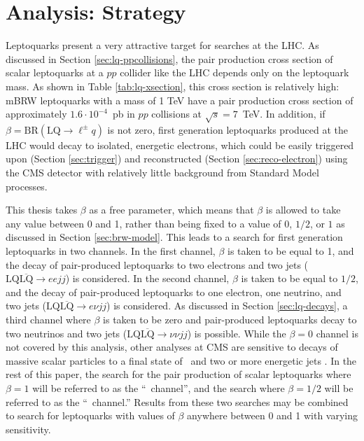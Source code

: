 \chapter{Analysis: Strategy}
\label{ch:analysis-strategy}

Leptoquarks present a very attractive target for searches at the LHC. 
As discussed in Section \ref{sec:lq-ppcollisions}, 
the pair production cross section of scalar leptoquarks at a $pp$ 
collider like the LHC depends only on the leptoquark mass.
As shown in Table \ref{tab:lq-xsection}, this 
cross section is relatively high: mBRW leptoquarks with a mass of 1 TeV 
have a pair production cross section of approximately 
$1.6 \cdot 10^{-4}$~pb in $pp$ collisions at $\sqrt{s} = 7$~TeV.
In addition, if $\beta = \text{BR}(\text{LQ}\rightarrow\ell^{\pm}q)$
is not zero, first generation leptoquarks produced at the LHC would decay to
isolated, energetic electrons, which could be easily triggered upon 
(Section \ref{sec:trigger}) and reconstructed (Section \ref{sec:reco-electron}) using the CMS detector 
with relatively little background from Standard Model processes.

This thesis takes $\beta$ as a free parameter, which means that $\beta$ is allowed
to take any value between 0 and 1, rather than being fixed to a value of $0$,
$1/2$, or $1$ as discussed in Section \ref{sec:brw-model}.
This leads to a search for first generation leptoquarks in two channels.
In the first channel, $\beta$ is taken to be equal to 1, and 
the decay of pair-produced leptoquarks to two electrons and two jets
($\text{LQ}\overline{\text{LQ}}\rightarrow eejj$) is considered.
In the second channel, $\beta$ is taken to be equal to $1/2$, and 
the decay of pair-produced leptoquarks to one electron, one neutrino, and two jets 
($\text{LQ}\overline{\text{LQ}}\rightarrow e\nu jj$) is considered.
As discussed in Section \ref{sec:lq-decays}, a third channel 
where $\beta$ is taken to be zero and pair-produced leptoquarks decay to two 
neutrinos and two jets 
($\text{LQ}\overline{\text{LQ}}\rightarrow \nu\nu jj$) is possible.  
While the $\beta = 0$ channel is not 
covered by this analysis, other analyses at CMS are sensitive to decays 
of massive scalar particles to a final state of \met~and two or more energetic jets \cite{RA1susy-2011}.
In the rest of this paper, the search for the pair production of scalar 
leptoquarks where $\beta = 1$ will be referred to as the ``\eejj~channel'',
and the search where $\beta = 1/2$ will be referred to as the ``\enujj~channel.''
Results from these two searches may be combined to search for leptoquarks with 
values of $\beta$ anywhere between 0 and 1  with varying sensitivity.

